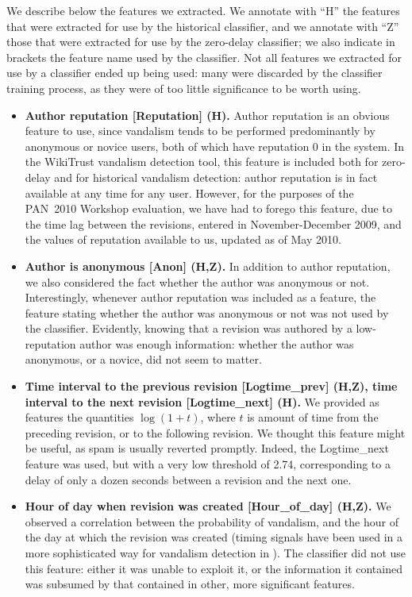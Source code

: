 We describe below the features we extracted.
We annotate with ``H'' the features that were extracted for use by the historical classifier, and we annotate with ``Z'' those that were extracted for use by the zero-delay classifier; we also indicate in brackets the feature name used by the classifier.
Not all features we extracted for use by a classifier ended up being used: many were discarded by the classifier training process, as they were of too little significance to be worth using.
%
\begin{itemize}

\item \textbf{Author reputation [Reputation] (H).}  Author reputation is an obvious feature to use, since vandalism tends to be performed predominantly by anonymous or novice users, both of which have reputation 0 in the system.
In the WikiTrust vandalism detection tool, this feature is included both for zero-delay and for historical vandalism detection: author reputation is in fact available at any time for any user.
However, for the purposes of the PAN~2010 Workshop evaluation, we have had to forego this feature, due to the time lag between the revisions, entered in November-December 2009, and the values of reputation available to us, updated as of May 2010.

\item \textbf{Author is anonymous [Anon] (H,Z).}  In addition to author reputation, we also considered the fact whether the author was anonymous or not.
Interestingly, whenever author reputation was included as a feature, the feature stating whether the author was anonymous or not was not used by the classifier.
Evidently, knowing that a revision was authored by a low-reputation author was enough information: whether the author was anonymous, or a novice, did not seem to matter.

\item \textbf{Time interval to the previous revision [Logtime\_prev] (H,Z), time interval to the next revision [Logtime\_next] (H).}
We provided as features the quantities $\log(1 + t)$, where $t$ is amount of time from the preceding revision, or to the following revision.
We thought this feature might be useful, as spam is usually reverted promptly.
Indeed, the Logtime\_next feature was used, but with a very low threshold of 2.74, corresponding to a delay of only a dozen seconds between a revision and the next one.

\item \textbf{Hour of day when revision was created [Hour\_of\_day] (H,Z).}
We observed a correlation between the probability of vandalism, and the hour of the day at which the revision was created (timing signals have been used in a more sophisticated way for vandalism detection in \cite{West2010}).  The classifier did not use this feature: either it was unable to exploit it, or the information it contained was subsumed by that contained in other, more significant features.


\end{itemize}
